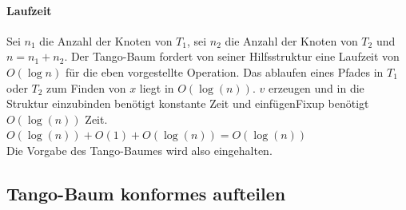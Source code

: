 \documentclass[a4paper,12pt]{article}
\begin{document}
\paragraph{Laufzeit}
Sei $n_1$ die Anzahl der Knoten von $T_1$, sei $n_2$ die Anzahl der Knoten von $T_2$ und $n = n_1 + n_2$. Der Tango-Baum fordert von seiner Hilfsstruktur eine Laufzeit von $O(\log n)$ für die eben vorgestellte Operation.  Das ablaufen eines Pfades in $T_1$ oder $T_2$ zum Finden von $x$ liegt in $O(\log (n))$. $v$ erzeugen und in die Struktur einzubinden benötigt konstante Zeit und einfügenFixup benötigt  $O(\log (n))$ Zeit.\\
$O(\log (n)) + O(1) +O(\log (n)) = O(\log (n))$\\
Die Vorgabe des Tango-Baumes wird also eingehalten.

\subsection{Tango-Baum konformes aufteilen}
\newpage


\end{document}
